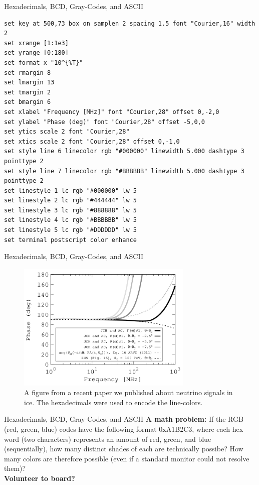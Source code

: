 \documentclass{beamer}
\begin{document}
\begin{frame}[fragile]{Hexadecimals, BCD, Gray-Codes, and ASCII}
\tiny
\begin{verbatim}
set key at 500,73 box on samplen 2 spacing 1.5 font "Courier,16" width 2
set xrange [1:1e3]
set yrange [0:180]
set format x "10^{%T}"
set rmargin 8
set lmargin 13
set tmargin 2
set bmargin 6
set xlabel "Frequency [MHz]" font "Courier,28" offset 0,-2,0
set ylabel "Phase (deg)" font "Courier,28" offset -5,0,0
set ytics scale 2 font "Courier,28"
set xtics scale 2 font "Courier,28" offset 0,-1,0
set style line 6 linecolor rgb "#000000" linewidth 5.000 dashtype 3 pointtype 2
set style line 7 linecolor rgb "#BBBBBB" linewidth 5.000 dashtype 3 pointtype 2
set linestyle 1 lc rgb "#000000" lw 5
set linestyle 2 lc rgb "#444444" lw 5
set linestyle 3 lc rgb "#888888" lw 5
set linestyle 4 lc rgb "#BBBBBB" lw 5
set linestyle 5 lc rgb "#DDDDDD" lw 5
set terminal postscript color enhance
\end{verbatim}
\end{frame}

\begin{frame}{Hexadecimals, BCD, Gray-Codes, and ASCII}
\begin{figure}
\centering
\includegraphics[width=0.75\textwidth]{figures/fromPaper.png}
\caption{\label{fig:frompaper} A figure from a recent paper we published about neutrino signals in ice.  The hexadecimals were used to encode the line-colors.}
\end{figure}
\end{frame}

\begin{frame}{Hexadecimals, BCD, Gray-Codes, and ASCII}
\textbf{A math problem:} If the RGB (red, green, blue) codes have the following format 0xA1B2C3, where each hex word (two characters) represents an amount of red, green, and blue (sequentially), how many distinct shades of each are technically possibe? How many colors are therefore possible (even if a standard monitor could not resolve them)? \\ \vspace{0.5cm}
\textbf{Volunteer to board?}
\end{frame}
\end{document}
